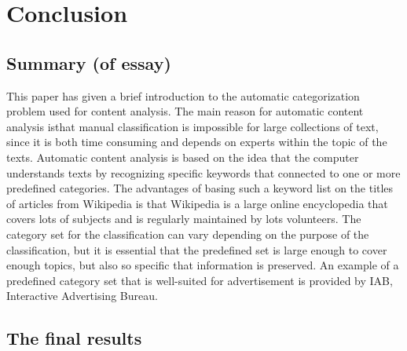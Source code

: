 \section{Conclusion}
\subsection{Summary (of essay)}
This paper has given a brief introduction to the automatic categorization problem used for content analysis. The main reason for automatic content analysis isthat manual classification is impossible for large collections of text, since it is both time consuming and  depends on experts within the topic of the texts. Automatic content analysis is based on the idea that the computer understands texts by recognizing specific keywords that  connected to one or more predefined categories. The advantages of basing such a keyword list on the titles of articles from Wikipedia is that Wikipedia is a large online encyclopedia that covers lots of subjects and is regularly maintained by lots volunteers. The category set for the classification can vary depending on the purpose of the classification, but it is essential that the predefined set is large enough to cover enough topics, but also so specific that information is preserved. An example of a predefined category set that is well-suited for advertisement is provided by IAB, Interactive Advertising Bureau. 

\subsection{The final results}